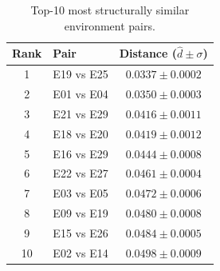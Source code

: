 \begin{table}[htbp]
\centering
\caption{Top-10 most structurally similar environment pairs.}
\label{tab:most_similar}
\begin{tabular}{clc}
\toprule
\textbf{Rank} & \textbf{Pair} & \textbf{Distance ($\hat{d} \pm \sigma$)} \\
\midrule
1 & E19 vs E25 & $0.0337 \pm 0.0002$ \\
2 & E01 vs E04 & $0.0350 \pm 0.0003$ \\
3 & E21 vs E29 & $0.0416 \pm 0.0011$ \\
4 & E18 vs E20 & $0.0419 \pm 0.0012$ \\
5 & E16 vs E29 & $0.0444 \pm 0.0008$ \\
6 & E22 vs E27 & $0.0461 \pm 0.0004$ \\
7 & E03 vs E05 & $0.0472 \pm 0.0006$ \\
8 & E09 vs E19 & $0.0480 \pm 0.0008$ \\
9 & E15 vs E26 & $0.0484 \pm 0.0005$ \\
10 & E02 vs E14 & $0.0498 \pm 0.0009$ \\
\bottomrule
\end{tabular}
\end{table}
